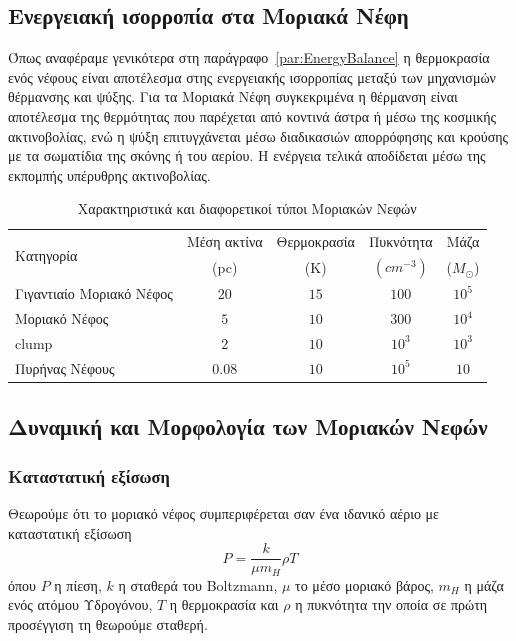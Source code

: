 \documentclass[a4paper,12pt]{memoir}
\newcommand{\sm}{$M_{\odot}$}
\begin{document}
\subsection{Ενεργειακή ισορροπία στα Μοριακά Νέφη}
Όπως αναφέραμε γενικότερα στη παράγραφο~\ref{par:EnergyBalance} η θερμοκρασία ενός νέφους είναι αποτέλεσμα στης ενεργειακής ισορροπίας μεταξύ των μηχανισμών θέρμανσης και ψύξης. Για τα Μοριακά Νέφη συγκεκριμένα η θέρμανση είναι αποτέλεσμα της θερμότητας που παρέχεται από κοντινά άστρα ή μέσω της κοσμικής ακτινοβολίας, ενώ η ψύξη επιτυγχάνεται μέσω διαδικασιών απορρόφησης και κρούσης με τα σωματίδια της σκόνης ή του αερίου.
Η ενέργεια τελικά αποδίδεται μέσω της εκπομπής υπέρυθρης ακτινοβολίας.

%
\begin{table}
	\caption{Χαρακτηριστικά και διαφορετικοί τύποι Μοριακών Νεφών}
	\label{tab:MCtypes}
	\begin{tabular}{l c c c c}
		\toprule
		\multirow{2}{*}{Κατηγορία} & Μέση ακτίνα &  Θερμοκρασία & Πυκνότητα \ce{H2} & Μάζα \\ 
		& (pc) & (K) & $(cm^{-3})$ & (\sm) \\
		\midrule
		Γιγαντιαίο Μοριακό Νέφος & $20$ & $15$ & $100$ & $10^5$ \\
		Μοριακό Νέφος & $5$ & $10$ & $300$ & $10^4$\\
		clump & $2$ & $10$ & $10^3$ & $10^3$\\
		Πυρήνας Νέφους & $0.08$ & $10$ & $10^5$ & $10$\\
		\bottomrule
	\end{tabular}
\end{table}

\subsection{Δυναμική και Μορφολογία των Μοριακών Νεφών}
\subsubsection{Καταστατική εξίσωση}
Θεωρούμε ότι το μοριακό νέφος συμπεριφέρεται σαν ένα ιδανικό αέριο με καταστατική εξίσωση
\begin{equation}
P=\frac{k}{\mu m_{H}} \rho T
\end{equation}
όπου $P$ η πίεση, $k$ η σταθερά του Boltzmann, $\mu$ το μέσο μοριακό βάρος, $m_{H}$ η μάζα ενός ατόμου Υδρογόνου, $T$ η θερμοκρασία και $\rho$ η πυκνότητα την οποία σε πρώτη προσέγγιση τη θεωρούμε σταθερή.
\end{document}
